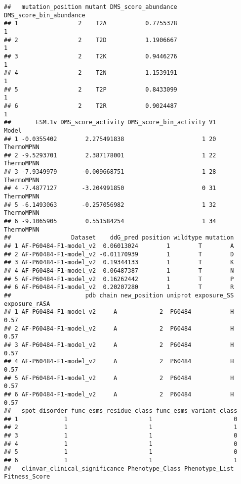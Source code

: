 \documentclass[
]{article}
\begin{document}
\begin{verbatim}
##   mutation_position mutant DMS_score_abundance DMS_score_bin_abundance
## 1                 2    T2A           0.7755378                       1
## 2                 2    T2D           1.1906667                       1
## 3                 2    T2K           0.9446276                       1
## 4                 2    T2N           1.1539191                       1
## 5                 2    T2P           0.8433099                       1
## 6                 2    T2R           0.9024487                       1
##       ESM.1v DMS_score_activity DMS_score_bin_activity V1      Model
## 1 -0.0355402        2.275491838                      1 20 ThermoMPNN
## 2 -9.5293701        2.387178001                      1 22 ThermoMPNN
## 3 -7.9349979       -0.009668751                      1 28 ThermoMPNN
## 4 -7.4877127       -3.204991850                      0 31 ThermoMPNN
## 5 -6.1493063       -0.257056982                      1 32 ThermoMPNN
## 6 -9.1065905        0.551584254                      1 34 ThermoMPNN
##                 Dataset    ddG_pred position wildtype mutation
## 1 AF-P60484-F1-model_v2  0.06013024        1        T        A
## 2 AF-P60484-F1-model_v2 -0.01170939        1        T        D
## 3 AF-P60484-F1-model_v2  0.19344133        1        T        K
## 4 AF-P60484-F1-model_v2  0.06487387        1        T        N
## 5 AF-P60484-F1-model_v2  0.16262442        1        T        P
## 6 AF-P60484-F1-model_v2  0.20207280        1        T        R
##                     pdb chain new_position uniprot exposure_SS exposure_rASA
## 1 AF-P60484-F1-model_v2     A            2  P60484           H          0.57
## 2 AF-P60484-F1-model_v2     A            2  P60484           H          0.57
## 3 AF-P60484-F1-model_v2     A            2  P60484           H          0.57
## 4 AF-P60484-F1-model_v2     A            2  P60484           H          0.57
## 5 AF-P60484-F1-model_v2     A            2  P60484           H          0.57
## 6 AF-P60484-F1-model_v2     A            2  P60484           H          0.57
##   spot_disorder func_esms_residue_class func_esms_variant_class
## 1             1                       1                       0
## 2             1                       1                       1
## 3             1                       1                       0
## 4             1                       1                       0
## 5             1                       1                       0
## 6             1                       1                       1
##   clinvar_clinical_significance Phenotype_Class Phenotype_List Fitness_Score

\end{verbatim}
\end{document}

